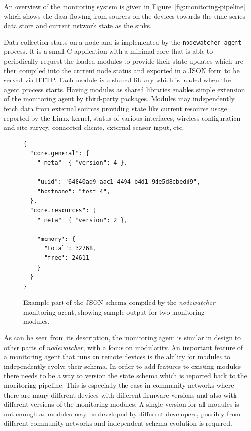 \documentclass[5p,sort&compress]{elsarticle}
\newcommand{\nodewatcher}{\textit{nodewatcher}}
\begin{document}
An overview of the monitoring system is given in Figure~\ref{fig:monitoring-pipeline} which shows the data flowing from sources on the devices towards the time series data store and current network state as the sinks.

Data collection starts on a node and is implemented by the \texttt{nodewatcher-agent} process.
It is a small C application with a minimal core that is able to periodically request the loaded modules to provide their state updates which are then compiled into the current node status and exported in a JSON form to be served via HTTP.
Each module is a shared library which is loaded when the agent process starts.
Having modules as shared libraries enables simple extension of the monitoring agent by third-party packages.
Modules may independently fetch data from external sources providing state like current resource usage reported by the Linux kernel, status of various interfaces, wireless configuration and site survey, connected clients, external sensor input, etc.

\begin{figure}[t]
\centering
\begin{verbatim}
{
  "core.general": {
    "_meta": { "version": 4 },
    
    "uuid": "64840ad9-aac1-4494-b4d1-9de5d8cbedd9",
    "hostname": "test-4",
  },
  "core.resources": {
    "_meta": { "version": 2 },
    
    "memory": {
      "total": 32768,
      "free": 24611
    }
  }
}
\end{verbatim}
\caption{Example part of the JSON schema compiled by the \nodewatcher{} monitoring agent, showing sample output for two monitoring modules.}
\label{fig:monitoring-json-schema}
\end{figure}

As can be seen from its description, the monitoring agent is similar in design to other parts of \nodewatcher{}, with a focus on modularity.
An important feature of a monitoring agent that runs on remote devices is the ability for modules to independently evolve their schema.
In order to add features to existing modules there needs to be a way to version the state schema which is reported back to the monitoring pipeline.
This is especially the case in community networks where there are many different devices with different firmware versions and also with different versions of the monitoring modules.
A single version for all modules is not enough as modules may be developed by different developers, possibly from different community networks and independent schema evolution is required.
\end{document}
